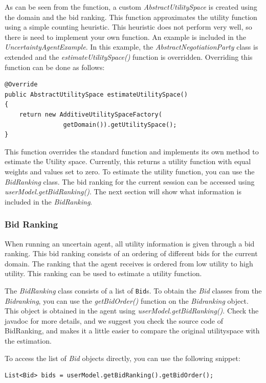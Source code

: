 \documentclass[]{llncs}
\begin{document}
As can be seen from the function, a custom \textit{AbstractUtilitySpace} is created using the domain and the bid ranking. This function approximates the utility function using a simple counting heuristic. This heuristic does not perform very well, so there is need to implement your own function. An example is included in the \textit{UncertaintyAgentExample}. In this example, the \textit{AbstractNegotiationParty} class is extended and the \textit{estimateUtilitySpace()} function is overridden. Overriding this function can be done as follows:
\begin{lstlisting}
@Override
public AbstractUtilitySpace estimateUtilitySpace() 
{
	return new AdditiveUtilitySpaceFactory(
	            getDomain()).getUtilitySpace();
}
\end{lstlisting}

This function overrides the standard function and implements its own method to estimate the Utility space. Currently, this returns a utility function with equal weights and values set to zero. To estimate the utility function, you can use the \textit{BidRanking} class. The bid ranking for the current session can be accessed using \textit{userModel.getBidRanking()}. The next section will show what information is included in the \textit{BidRanking}.

\subsubsection{Bid Ranking}
When running an uncertain agent, all utility information is given through a bid ranking. This bid ranking consists of an ordering of different bids for the current domain. The ranking that the agent receives is ordered from low utility to high utility. This ranking can be used to estimate a utility function. 

The \textit{BidRanking} class consists of a list of \verb|Bid|s. To obtain the \textit{Bid} classes from the \textit{Bidranking}, you can use the \textit{getBidOrder()} function on the \textit{Bidranking} object. This object is obtained in the agent using \textit{userModel.getBidRanking()}. Check the javadoc for more details, and we suggest you check the source code of BidRanking, and makes it a little easier to compare the original utilityspace with the estimation.

To access the list of \textit{Bid} objects directly, you can use the following snippet:
\begin{lstlisting}
List<Bid> bids = userModel.getBidRanking().getBidOrder();
\end{lstlisting}
\end{document}
